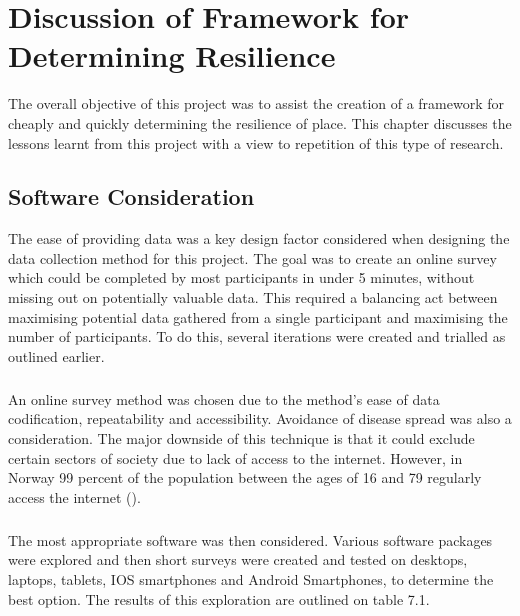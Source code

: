 
\chapter{Discussion of Framework for Determining Resilience}
The overall objective of this project was to assist the creation of a framework for cheaply and quickly determining the resilience of place. This chapter discusses the lessons learnt from this project with a view to repetition of this type of research.

\section{Software Consideration}
The ease of providing data was a key design factor considered when designing the data collection method for this project. The goal was to create an online survey which could be completed by most participants in under 5 minutes, without missing out on potentially valuable data. This required a balancing act between maximising potential data gathered from a single participant and maximising the number of participants. To do this, several iterations were created and trialled as outlined earlier.
\paragraph{}
An online survey method was chosen due to the method's ease of data codification, repeatability and accessibility. Avoidance of disease spread was also a consideration. The major downside of this technique is that it could exclude certain sectors of society due to lack of access to the internet. However, in Norway 99 percent of the population between the ages of 16 and 79 regularly access the internet (\cite{walther-zhang_ict_2022}). 
\paragraph{}
The most appropriate software was then considered.  Various software packages were explored and then short surveys were created and  tested on desktops, laptops, tablets, IOS smartphones and Android Smartphones, to determine the best option. The results of this exploration are outlined on table 7.1.

